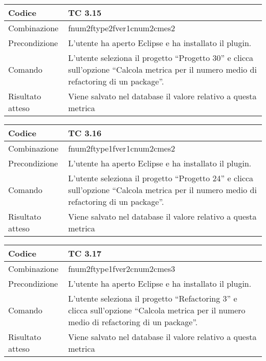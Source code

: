 \begin{table}[ht]
\begin{tabular}{|p{3cm}|p{9cm}|}
\hline
\cellcolor{lightgray}Codice				& TC 3.15								\\
\hline
\cellcolor{lightgray}Combinazione		& fnum2ftype2fver1cnum2cmes2  									\\
\hline
\cellcolor{lightgray}Precondizione		& L'utente ha aperto Eclipse e ha installato il plugin.			\\
\hline
\cellcolor{lightgray}Comando			& L'utente seleziona il progetto ``Progetto 30''  e clicca sull'opzione 
``Calcola metrica per il numero medio di refactoring di un package''.	\\
\hline
\cellcolor{lightgray}Risultato atteso	& Viene salvato nel database il valore relativo a questa metrica	\\
\hline
\end{tabular}
\end{table}

\begin{table}[ht]
\begin{tabular}{|p{3cm}|p{9cm}|}
\hline
\cellcolor{lightgray}Codice				& TC 3.16								\\
\hline
\cellcolor{lightgray}Combinazione		& fnum2ftype1fver1cnum2cmes2 									\\
\hline
\cellcolor{lightgray}Precondizione		& L'utente ha aperto Eclipse e ha installato il plugin.				\\
\hline
\cellcolor{lightgray}Comando			& L'utente seleziona il progetto ``Progetto 24''  e clicca sull'opzione ``Calcola metrica per il numero medio di refactoring di un package''.	\\
\hline
\cellcolor{lightgray}Risultato atteso	& Viene salvato nel database il valore relativo a questa metrica	\\
\hline
\end{tabular}
\end{table}

\begin{table}[ht]
\begin{tabular}{|p{3cm}|p{9cm}|}
\hline
\cellcolor{lightgray}Codice				& TC 3.17								\\
\hline
\cellcolor{lightgray}Combinazione		& fnum2ftype1fver2cnum2cmes3 								\\
\hline
\cellcolor{lightgray}Precondizione		& L'utente ha aperto Eclipse e ha installato il plugin.									\\
\hline
\cellcolor{lightgray}Comando			& L'utente seleziona il progetto ``Refactoring 3''  e clicca sull'opzione ``Calcola metrica per il numero medio di refactoring di un package''.	\\
\hline
\cellcolor{lightgray}Risultato atteso	& Viene salvato nel database il valore relativo a questa metrica	\\
\hline
\end{tabular}
\end{table}

